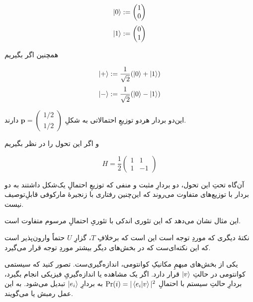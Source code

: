 \documentclass[a4paper,12pt]{article}
\begin{document}
\begin{equation} \ket{0} := \begin{pmatrix} 1 \\ 0 \end{pmatrix} \end{equation}
\begin{equation} \ket{1} := \begin{pmatrix} 0 \\ 1 \end{pmatrix} \end{equation}

همچنین اگر بگیریم

\begin{equation} \ket{+} := \frac{1}{\sqrt{2}} (\ket{0} + \ket{1}) \end{equation}
\begin{equation} \ket{-} := \frac{1}{\sqrt{2}} (\ket{0} - \ket{1}) \end{equation}

این‌دو بردار هردو توزیعِ احتمالاتی به شکلِ 
\(\mathbf{p} = \begin{pmatrix} 1/2 \\ 1/2 \end{pmatrix} \)
دارند.

و اگر این تحول را در نظر بگیریم

\begin{equation} H = \frac{1}{2} \begin{pmatrix} 1 & 1 \\ 1 & -1 \end{pmatrix} \end{equation}

آن‌گاه تحتِ این تحول، دو بردارِ مثبت و منفی که توزیعِ احتمالِ یک‌شکل داشتند به دو بردار با توزیع‌های متفاوت می‌روند که این‌چنین رفتاری با زنجیرهٔ مارکوفی قابلِ‌توصیف نیست.

این مثال نشان می‌دهد که این تئوری اندکی با تئوریِ احتمالِ مرسوم متفاوت است.

نکتهٔ دیگری که موردِ‌ توجه است این است که برخلافِ \(T\)، گزارِ \(U\) حتماً وارون‌پذیر است که این نکته‌ای‌ست که در بخش‌های دیگر بیشتر موردِ توجه قرار می‌گیرد.


یکی از بخش‌های مبهمِ مکانیکِ کوانتومی، اندازه‌گیری‌ست. تصور کنید که سیستمی کوانتومی در حالتِ
\(\ket{v}\)
قرار دارد. اگر یک مشاهده یا اندازه‌گیریِ فیزیکی انجام بگیرد، بردارِ حالتِ سیستم با احتمالِ
\(\Pr(i) = |\braket{e_i}{v}|^2\)
به بردارِ 
\(\ket{e_i}\)
تبدیل می‌شود. به این عمل رمبش یا
می‌گویند.
\end{document}
